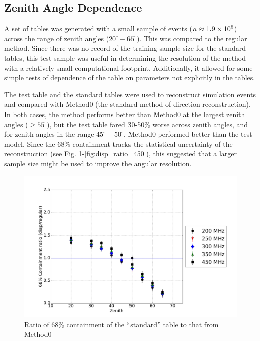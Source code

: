 \documentclass[main.tex]{subfiles}
\begin{document}
\subsection{Zenith Angle Dependence}
A set of \disp tables was generated with a small sample of events ($n\approx 1.9\times 10^{6}$) across the range of zenith angles ($20^\circ-65^\circ$). This was compared to the regular \disp method. Since there was no record of the training sample size for the standard tables, this test sample was useful in determining the resolution of the \disp method with a relatively small computational footprint. Additionally, it allowed for some simple tests of dependence of the \disp table on parameters not explicitly in the \disp tables.

The test \disp table and the standard \disp tables were used to reconstruct simulation events and compared with Method0 (the standard method of direction reconstruction). In both cases, the \disp method performs better than Method0 at the largest zenith angles ($\geq 55^\circ$), but the test \disp table fared 30-50\% worse across zenith angles, and for zenith angles in the range $45^\circ-50^\circ$, Method0 performed better than the test model. Since the 68\% containment tracks the statistical uncertainty of the \disp reconstruction (see Fig. \ref{fig:olddisp_ratio}-\ref{fig:disp_ratio_450}), this suggested that a larger sample size might be used to improve the angular resolution.

\begin{figure}[htbp]
  \begin{center}
      \includegraphics[width=0.8\linewidth]{images/disp_standard_ratio_xzen}
      \caption[``standard'' \disp table reconstruction]{Ratio of 68\% containment of the ``standard'' \disp table to that from Method0}  
      \label{fig:olddisp_ratio}
  \end{center}
\end{figure}
\end{document}
